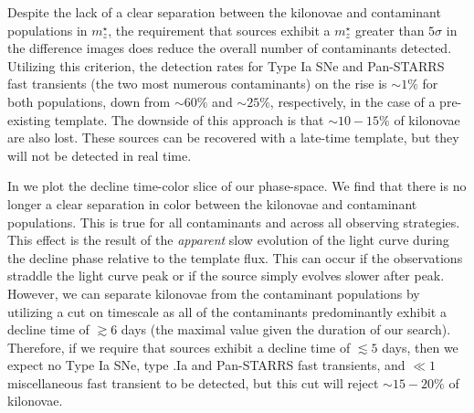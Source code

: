 Despite the lack of a clear separation between the kilonovae and contaminant populations in $m^{\star}_z$, the requirement that sources exhibit a $m^{\star}_z$ greater than $5\sigma$ in the difference images does reduce the overall number of contaminants detected. Utilizing this criterion, the detection rates for Type Ia SNe and Pan-STARRS fast transients (the two most numerous contaminants) on the rise is $\sim1\%$ for both populations, down from $\sim60\%$ and $\sim25\%$, respectively, in the case of a pre-existing template. The downside of this approach is that $\sim10-15\%$ of kilonovae are also lost. These sources can be recovered with a late-time template, but they will not be detected in real time.

In  we plot the decline time-color slice of our phase-space. We find that there is no longer a clear separation in color between the kilonovae and contaminant populations. This is true for all contaminants and across all observing strategies. This effect is the result of the {\em apparent} slow evolution of the light curve during the decline phase relative to the template flux. This can occur if the observations straddle the light curve peak or if the source simply evolves slower after peak. However, we can separate kilonovae from the contaminant populations by utilizing a cut on timescale as all of the contaminants predominantly exhibit a decline time of $\gtrsim 6$ days (the maximal value given the duration of our search). Therefore, if we require that sources exhibit a decline time of $\lesssim 5$ days, then we expect no Type Ia SNe, type .Ia and Pan-STARRS fast transients, and $\ll 1$ miscellaneous fast transient to be detected, but this cut will reject $\sim15-20\%$ of kilonovae.

